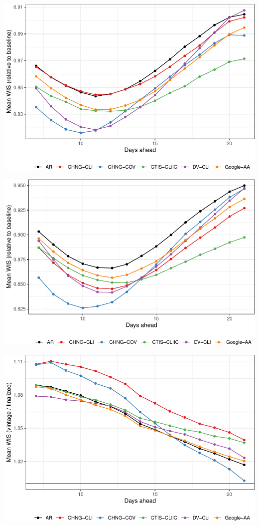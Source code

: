 \documentclass[9pt,twoside,lineno]{pnas-new}
\begin{document}
\begin{center}\includegraphics[width=\linewidth]{fig/fcast-1} \end{center}

\begin{center}\includegraphics[width=\linewidth]{fig/fcast-finalized-1} \end{center}

\begin{center}\includegraphics[width=\linewidth]{fig/fcast-honest-v-finalized-1} \end{center}
\end{document}
